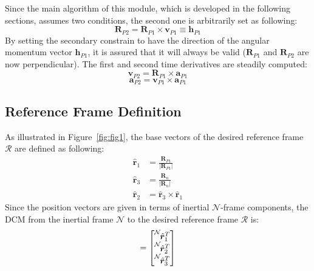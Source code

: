 Since the main algorithm of this module, which is developed in the following sections, assumes two conditions, the second one is arbitrarily set as following:
\begin{equation}
	\bm{R}_{P2} = \bm{R}_{P1} \times \bm{v}_{P1} \equiv  \bm{h}_{P1}
\end{equation}
By setting the secondary constrain to have the direction of the angular momentum vector $ \bm{h}_{P1}$, it is assured that it will always be valid ($\bm{R}_{P1}$ and $\bm{R}_{P2}$ are now perpendicular).
The first and second time derivatives are steadily computed:
\begin{equation}
	\bm{v}_{P2} =  \bm{R}_{P1} \times \bm{a}_{P1} 
\end{equation}
\begin{equation}
	\bm{a}_{P2} =  \bm{v}_{P1} \times \bm{a}_{P1} 
\end{equation}
\subsection{Reference Frame Definition}
As illustrated in Figure~\ref{fig:fig1}, the base vectors of the desired reference frame $\mathcal{R}$  are defined as following:
\begin{subequations}
	\begin{align}
		\hat{\bm r}_{1} &= \frac{{\bm R}_{P1}} {|{\bm R}_{P1}|} \\
		\hat{\bm r}_{3} &= \frac{{\bm R}_{n}}{|{\bm R}_{n}|} \\
		\hat{\bm r}_{2} &=  \hat{\bm r}_{3} \times \hat{\bm r}_{1} 
	\end{align}
\end{subequations}
Since the position vectors are given in terms of inertial $\mathcal{N}$-frame components, the DCM from the inertial frame $\mathcal{N}$ to the desired reference frame $\mathcal{R}$ is:
\begin{equation}
	[RN] = \begin{bmatrix}
		\leftexp{N}{ \hat{\bm r}_{1}^{T} } \\
		\leftexp{N}{ \hat{\bm r}_{2}^{T} }  \\
		\leftexp{N}{ \hat{\bm r}_{3}^{T} }  
	\end{bmatrix}
\end{equation}
